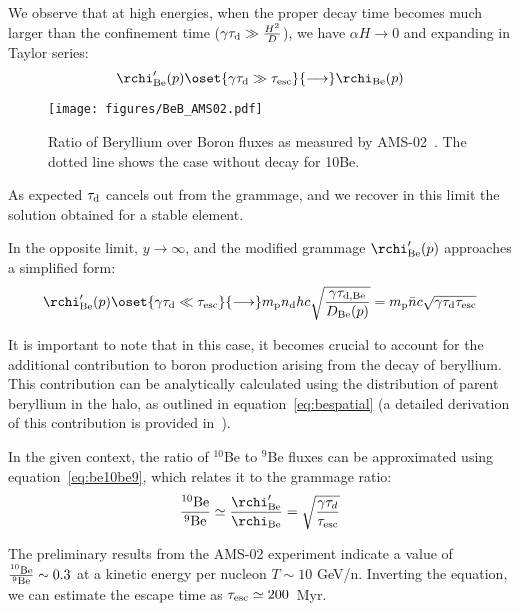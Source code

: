We observe that at high energies, when the proper decay time becomes much larger than the confinement time ($\gamma \tau_{\rm d} \gg \frac{H^2}{D}$), we have $\alpha H \rightarrow 0$ and expanding in Taylor series:
%
\begin{equation} 
\rchi_{\rm Be}^\prime(p) 
\oset{\gamma\tau_{\rm d} \gg \tau_{\rm esc}}{\longrightarrow} 
\rchi_{\rm Be}(p)
\end{equation}

\begin{figure}
\centering
\texttt{[image: figures/BeB\_AMS02.pdf]}
\caption{Ratio of Beryllium over Boron fluxes as measured by AMS-02~\cite{AMS02libeb}. The dotted line shows the case without decay for 10Be.}
\label{fig:beb}
\end{figure}

As expected $\tau_{\rm d}$ cancels out from the grammage, and we recover in this limit the solution obtained for a stable element.

In the opposite limit, $y \rightarrow \infty$, and the modified grammage $\rchi_{\rm Be}^\prime(p)$ approaches a simplified form:
%
\begin{equation}
\rchi_{\rm Be}^\prime(p) 
\oset{\gamma\tau_{\rm d} \ll \tau_{\rm esc}}{\longrightarrow} 
m_{\rm p} n_{\rm d} h c \sqrt{\frac{\gamma\tau_{\rm d, Be}}{D_{\rm Be}(p)}} = 
m_{\rm p} \bar n c \sqrt{\gamma \tau_{\rm d} \tau_{\rm esc}} 
\label{eq:be10be9}
\end{equation}

It is important to note that in this case, it becomes crucial to account for the additional contribution to boron production arising from the decay of beryllium. This contribution can be analytically calculated using the distribution of parent beryllium in the halo, as outlined in equation~\eqref{eq:bespatial} (a detailed derivation of this contribution is provided in~\cite{Evoli2020prd}).

In the given context, the ratio of $^{10}$Be to $^9$Be fluxes can be approximated using equation~\eqref{eq:be10be9}, which relates it to the grammage ratio:
%
\begin{equation}
\frac{\rm {^{10}}Be}{\rm {^{9}}Be} \simeq \frac{\rchi^\prime_{\rm Be}}{\rchi_{\rm Be}} = \sqrt{\frac{\gamma \tau_d}{\tau_{\rm esc}}}
\label{eq:chibe10be9}
\end{equation}

The preliminary results from the AMS-02 experiment indicate a value of $\frac{\rm {^{10}}Be}{\rm {^{9}}Be} \sim 0.3$ at a kinetic energy per nucleon $T \sim 10$ GeV/n. Inverting the equation, we can estimate the escape time as $\tau_{\rm esc} \simeq 200$~Myr.

